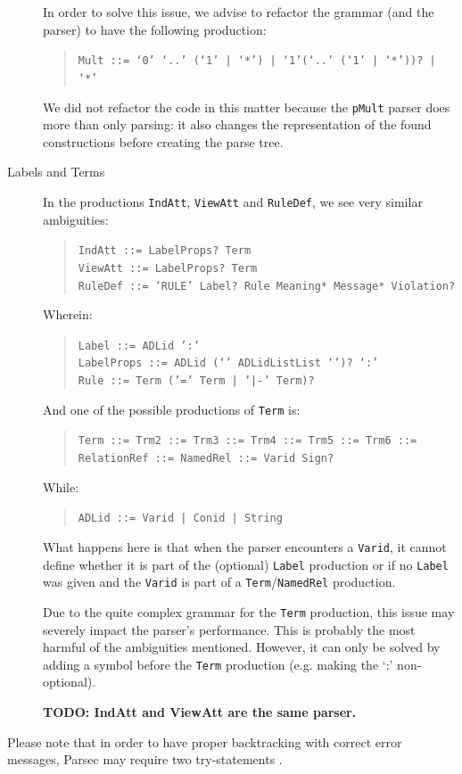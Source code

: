 \begin{description}
    In order to solve this issue, we advise to refactor the grammar (and the parser) to have the following production:
    \begin{quote}
        \texttt{Mult ::= `0' `..' (`1' | `*') | `1'(`..' (`1' | `*'))? | `*'}
    \end{quote}
    We did not refactor the code in this matter because the \texttt{pMult} parser does more than only parsing: it also changes the representation of the found constructions before creating the parse tree.
  
  \item[Labels and Terms]
    In the productions \texttt{IndAtt}, \texttt{ViewAtt} and \texttt{RuleDef}, we see very similar ambiguities:
    \begin{quote}
        \texttt{IndAtt ::= LabelProps? Term}\\
        \texttt{ViewAtt ::= LabelProps? Term}\\
        \texttt{RuleDef ::= `RULE' Label? Rule Meaning* Message* Violation?}
    \end{quote}
    Wherein:
    \begin{quote}
        \texttt{Label ::= ADLid ':'}\\
        \texttt{LabelProps ::= ADLid (`{' ADLidListList `}')? `:'}\\
        \texttt{Rule ::= Term ('=' Term | '|-' Term)?}
    \end{quote}
    And one of the possible productions of \texttt{Term} is:
    \begin{quote}
        \texttt{Term ::= Trm2 ::= Trm3 ::= Trm4 ::= Trm5 ::= Trm6 ::= RelationRef ::= NamedRel ::= Varid Sign?}
    \end{quote}
    While:
    \begin{quote}
        \texttt{ADLid ::= Varid | Conid | String}
    \end{quote}
    
    What happens here is that when the parser encounters a \texttt{Varid}, it cannot define whether it is part of the (optional) \texttt{Label} production or if no \texttt{Label} was given and the \texttt{Varid} is part of a \texttt{Term}/\texttt{NamedRel} production.
    
    Due to the quite complex grammar for the \texttt{Term} production, this issue may severely impact the parser's performance.
    This is probably the most harmful of the ambiguities mentioned.
    However, it can only be solved by adding a symbol before the \texttt{Term} production (e.g. making the `:' non-optional).
    
    \textbf{TODO: IndAtt and ViewAtt are the same parser.}
\end{description}
%
Please note that in order to have proper backtracking with correct error messages, Parsec may require two try-statements .

